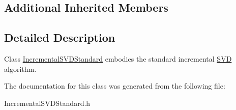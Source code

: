 \subsection*{Additional Inherited Members}


\subsection{Detailed Description}
Class \hyperlink{class_c_a_r_o_m_1_1_incremental_s_v_d_standard}{Incremental\-S\-V\-D\-Standard} embodies the standard incremental \hyperlink{class_c_a_r_o_m_1_1_s_v_d}{S\-V\-D} algorithm. 

The documentation for this class was generated from the following file\-:\begin{DoxyCompactItemize}
\item 
Incremental\-S\-V\-D\-Standard.\-h\end{DoxyCompactItemize}
